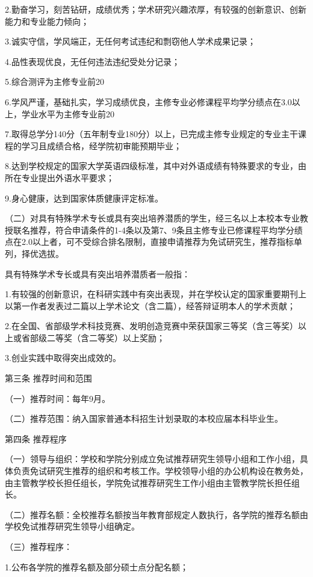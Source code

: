 \documentclass[UTF8,12pt,a4paper]{report}
\begin{document}
2.勤奋学习，刻苦钻研，成绩优秀；学术研究兴趣浓厚，有较强的创新意识、创新能力和专业能力倾向；

3.诚实守信，学风端正，无任何考试违纪和剽窃他人学术成果记录；

4.品性表现优良，无任何违法违纪受处分记录；

5.综合测评为主修专业前20%

6.学风严谨，基础扎实，学习成绩优良，主修专业必修课程平均学分绩点在3.0以上，学业水平为主修专业前20%

7.取得总学分140分（五年制专业180分）以上，已完成主修专业规定的专业主干课程的学习且成绩合格，经学院初审能预期毕业；

8.达到学校规定的国家大学英语四级标准，其中对外语成绩有特殊要求的专业，由所在专业提出外语水平要求；

9.身心健康，达到国家体质健康评定标准。

（二）对具有特殊学术专长或具有突出培养潜质的学生，经三名以上本校本专业教授联名推荐，符合申请条件的1-4条以及第7、9条且主修专业已修课程平均学分绩点在2.0以上者，可不受综合排名限制，直接申请推荐为免试研究生，推荐指标单列，择优选拔。

具有特殊学术专长或具有突出培养潜质者一般指：

1.有较强的创新意识，在科研实践中有突出表现，并在学校认定的国家重要期刊上以第一作者发表过二篇以上学术论文（含二篇），经答辩证明本人的学术贡献；

2.在全国、省部级学术科技竞赛、发明创造竞赛中荣获国家三等奖（含三等奖）以上或省部级二等奖（含二等奖）以上奖励；

3.创业实践中取得突出成效的。

第三条 推荐时间和范围

（一）推荐时间：每年9月。

（二）推荐范围：纳入国家普通本科招生计划录取的本校应届本科毕业生。

第四条 推荐程序

（一）领导与组织：学校和学院分别成立免试推荐研究生领导小组和工作小组，具体负责免试研究生推荐的组织和考核工作。学校领导小组的办公机构设在教务处，由主管教学校长担任组长，学院免试推荐研究生工作小组由主管教学院长担任组长。

（二）推荐名额：全校推荐名额按当年教育部规定人数执行，各学院的推荐名额由学校免试推荐研究生领导小组确定。

（三）推荐程序：

1.公布各学院的推荐名额及部分硕士点分配名额；
\end{document}

